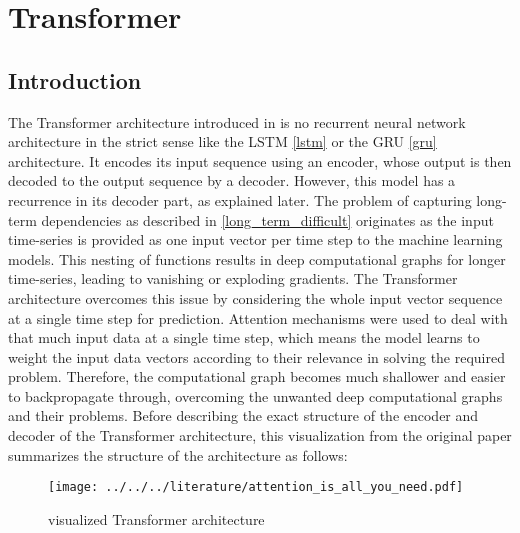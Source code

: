 \documentclass[draft,final]{vutinfth} %
\begin{document}
    \section{Transformer} \label{transformer}
    \subsection{Introduction}
    The Transformer architecture introduced in \cite{Transformer} is no recurrent neural network architecture in the strict sense like the LSTM \ref{lstm} or the GRU \ref{gru} architecture.
    It encodes its input sequence using an encoder, whose output is then decoded to the output sequence by a decoder.
    However, this model has a recurrence in its decoder part, as explained later.
    The problem of capturing long-term dependencies as described in \ref{long_term_difficult} originates as the input time-series is provided as one input vector per time step to the machine learning models.
    This nesting of functions results in deep computational graphs for longer time-series, leading to vanishing or exploding gradients.
    The Transformer architecture overcomes this issue by considering the whole input vector sequence at a single time step for prediction. 
    Attention mechanisms were used to deal with that much input data at a single time step, which means the model learns to weight the input data vectors according to their relevance in solving the required problem.
    Therefore, the computational graph becomes much shallower and easier to backpropagate through, overcoming the unwanted deep computational graphs and their problems.
    Before describing the exact structure of the encoder and decoder of the Transformer architecture, this visualization from the original paper summarizes the structure of the architecture as follows:
    \begin{figure}[H]
        \centering{}
        \texttt{[image: ../../../literature/attention\_is\_all\_you\_need.pdf]}
        \caption{visualized Transformer architecture \cite[p. 3]{Transformer}}
        \label{fig:transformer_vis}
    \end{figure}
\end{document}
